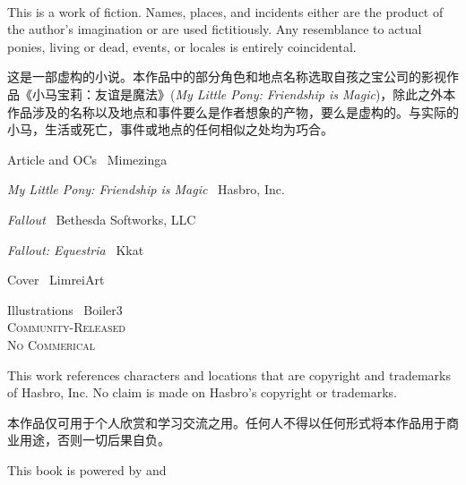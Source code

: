 \newpage

~\vfill

\thispagestyle{empty}

\begin{englishpar}
\noindent This is a work of fiction. Names, places, and incidents either are the product of the author's imagination or are used fictitiously. Any resemblance to actual ponies, living or dead, events, or locales is entirely coincidental.
\end{englishpar}

\noindent 这是一部虚构的小说。本作品中的部分角色和地点名称选取自孩之宝公司的影视作品《小马宝莉：友谊是魔法》(\emph{My Little Pony: Friendship is Magic})，除此之外本作品涉及的名称以及地点和事件要么是作者想象的产物，要么是虚构的。与实际的小马，生活或死亡，事件或地点的任何相似之处均为巧合。\\

\begin{englishpar}
\noindent Article and OCs \textcopyright\ Mimezinga

\noindent \emph{My Little Pony: Friendship is Magic} \textcopyright\ Hasbro, Inc.

\noindent \emph{Fallout} \textcopyright\ Bethesda Softworks, LLC

\noindent \emph{Fallout: Equestria} \textcopyright\ Kkat

\noindent Cover \textcopyright\ LimreiArt

\noindent Illustrations \textcopyright\ Boiler3 \\

\noindent \textsc{Community-Released}\\

\noindent \textsc{No Commerical}\\

\end{englishpar}

\begin{englishpar}
\noindent This work references characters and locations that are copyright and trademarks of Hasbro, Inc. No claim is made on Hasbro's copyright or trademarks.
\end{englishpar}

\noindent 本作品仅可用于个人欣赏和学习交流之用。任何人不得以任何形式将本作品用于商业用途，否则一切后果自负。\\

\begin{englishpar}
\noindent This book is powered by \XeLaTeX{} and \CTeX{}
\end{englishpar}

